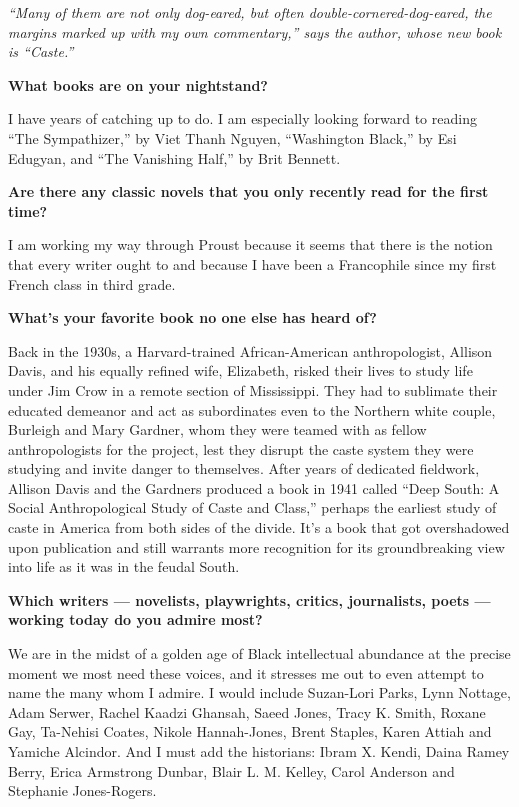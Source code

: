 \emph{``Many of them are not only dog-eared, but often
double-cornered-dog-eared, the margins marked up with my own
commentary,'' says the author, whose new book is ``Caste.''}

\textbf{What books are on your nightstand?}

I have years of catching up to do. I am especially looking forward to
reading ``The Sympathizer,'' by Viet Thanh Nguyen, ``Washington Black,''
by Esi Edugyan, and ``The Vanishing Half,'' by Brit Bennett.

\textbf{Are there any classic novels that you only recently read for the
first time?}

I am working my way through Proust because it seems that there is the
notion that every writer ought to and because I have been a Francophile
since my first French class in third grade.

\textbf{What's your favorite book no one else has heard of?}

Back in the 1930s, a Harvard-trained African-American anthropologist,
Allison Davis, and his equally refined wife, Elizabeth, risked their
lives to study life under Jim Crow in a remote section of Mississippi.
They had to sublimate their educated demeanor and act as subordinates
even to the Northern white couple, Burleigh and Mary Gardner, whom they
were teamed with as fellow anthropologists for the project, lest they
disrupt the caste system they were studying and invite danger to
themselves. After years of dedicated fieldwork, Allison Davis and the
Gardners produced a book in 1941 called ``Deep South: A Social
Anthropological Study of Caste and Class,'' perhaps the earliest study
of caste in America from both sides of the divide. It's a book that got
overshadowed upon publication and still warrants more recognition for
its groundbreaking view into life as it was in the feudal South.

\textbf{Which writers --- novelists, playwrights, critics, journalists,
poets --- working today do you admire most?}

We are in the midst of a golden age of Black intellectual abundance at
the precise moment we most need these voices, and it stresses me out to
even attempt to name the many whom I admire. I would include Suzan-Lori
Parks, Lynn Nottage, Adam Serwer, Rachel Kaadzi Ghansah, Saeed Jones,
Tracy K. Smith, Roxane Gay, Ta-Nehisi Coates, Nikole Hannah-Jones, Brent
Staples, Karen Attiah and Yamiche Alcindor. And I must add the
historians: Ibram X. Kendi, Daina Ramey Berry, Erica Armstrong Dunbar,
Blair L. M. Kelley, Carol Anderson and Stephanie Jones-Rogers.

